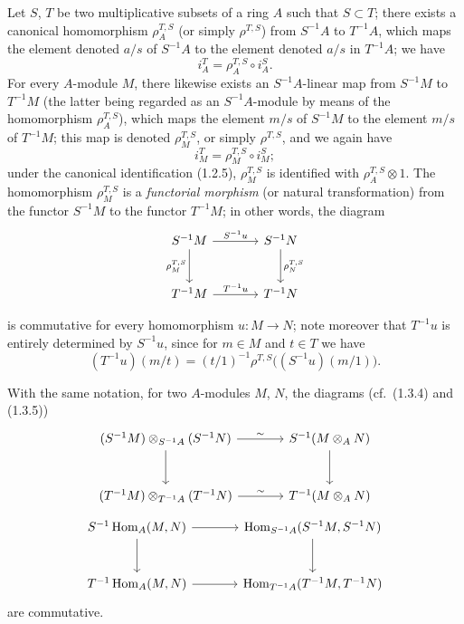 \begin{env}[1.4.1]
\label{0.1.4.1}
Let $S$, $T$ be two multiplicative subsets of a ring $A$ such that $S\subset T$; there exists a canonical homomorphism $\rho_A^{T,S}$ (or simply $\rho^{T,S}$) from $S^{-1}A$ to $T^{-1}A$, which maps the element denoted $a/s$ of $S^{-1}A$ to the element denoted $a/s$ in $T^{-1}A$; we have
\[
  i_A^T=\rho_A^{T,S}\circ i_A^S.
\]
For every $A$-module $M$, there likewise exists an $S^{-1}A$-linear map from $S^{-1}M$ to $T^{-1}M$ (the latter being regarded as an $S^{-1}A$-module by means of the homomorphism $\rho_A^{T,S}$), which maps the element $m/s$ of $S^{-1}M$ to the element $m/s$ of $T^{-1}M$; this map is denoted $\rho_M^{T,S}$, or simply $\rho^{T,S}$, and we again have
\[
  i_M^T=\rho_M^{T,S}\circ i_M^S;
\]
under the canonical identification (1.2.5), $\rho_M^{T,S}$ is identified with $\rho_A^{T,S}\otimes 1$.
The homomorphism $\rho_M^{T,S}$ is a \emph{functorial morphism} (or natural transformation) from the functor $S^{-1}M$ to the functor $T^{-1}M$; in other words, the diagram
\[
\begin{tikzcd}[column sep=large,row sep=large]
S^{-1}M \arrow[r,"S^{-1}u"] \arrow[d,"\rho_M^{T,S}"'] & S^{-1}N \arrow[d,"\rho_N^{T,S}"] \\
T^{-1}M \arrow[r,"T^{-1}u"] & T^{-1}N
\end{tikzcd}
\]

is commutative for every homomorphism $u:M\to N$; note moreover that $T^{-1}u$ is entirely determined by $S^{-1}u$, since for $m\in M$ and $t\in T$ we have
\[
  (T^{-1}u)(m/t)=(t/1)^{-1}\rho^{T,S}\bigl((S^{-1}u)(m/1)\bigr).
\]
\end{env}

\begin{env}[1.4.2]
\label{0.1.4.2}
With the same notation, for two $A$-modules $M$, $N$, the diagrams (cf.\ (1.3.4) and (1.3.5))
\[
\begin{tikzcd}[column sep=large,row sep=large]
(S^{-1}M)\otimes_{S^{-1}A}(S^{-1}N) \arrow[r,"\sim"] \arrow[d]
  & S^{-1}(M\otimes_A N) \arrow[d]
  \\
(T^{-1}M)\otimes_{T^{-1}A}(T^{-1}N) \arrow[r,"\sim"]
  & T^{-1}(M\otimes_A N)
\end{tikzcd}
\]
\[
\begin{tikzcd}[column sep=large,row sep=large]
S^{-1}\operatorname{Hom}_A(M,N) \arrow[r] \arrow[d]
  & \operatorname{Hom}_{S^{-1}A}(S^{-1}M,S^{-1}N) \arrow[d] \\
T^{-1}\operatorname{Hom}_A(M,N) \arrow[r]
  & \operatorname{Hom}_{T^{-1}A}(T^{-1}M,T^{-1}N)
\end{tikzcd}
\]
are commutative.
\end{env}

